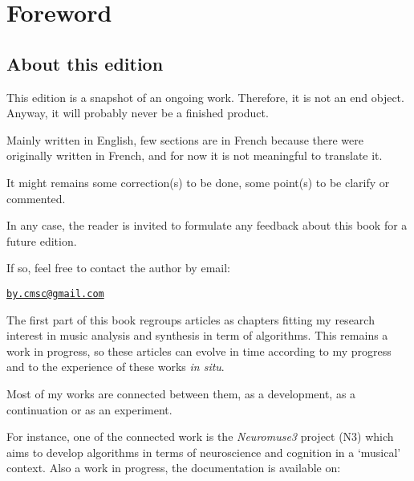 \frontmatter
\def\thepage{\arabic{page}}
\setcounter{page}{3}

\chapter*{Foreword}
\thispagestyle{empty}

\section*{About this edition}
\label{ate}

This edition is a snapshot of an ongoing work. Therefore, it is not an end object. Anyway, it will probably never be a finished product.

\smallskip

Mainly written in English, few sections are in French because there were originally written in French, and for now it is not meaningful to translate it. 

\smallskip

It might remains some correction(s) to be done, some point(s) to be clarify or commented. 

In any case, the reader is invited to formulate any feedback about this book for a future edition.

\smallskip

If so, feel free to contact the author by email: 

\smallskip

\quad \quad \href{mailto:jby.cmsc@gmail.com}{\texttt{by.cmsc@gmail.com}}

\bigskip

The first part of this book regroups articles as chapters fitting my research interest in music analysis and synthesis in term of algorithms. This remains a work in progress, so these articles can evolve in time according to my progress and to the experience of these works \textit{in situ}. 

\smallskip

Most of my works are connected between them, as a development, as a continuation or as an experiment.

\smallskip
For instance, one of the connected work is the \textsl{Neuromuse3} project (N3) which aims to develop algorithms in terms of neuroscience and cognition in a `musical' context. Also a work in progress, the documentation is available on:

